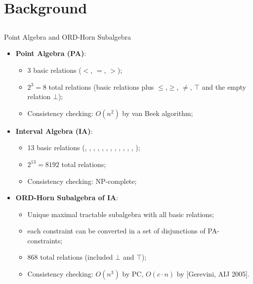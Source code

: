 \section{Background}

\subsection{}
\begin{frame}{Point Algebra and ORD-Horn Subalgebra}

	\begin{itemize}
		\item \textbf{Point Algebra (PA)}:
			\begin{itemize}
				\item 3 basic relations ($<$, $=$, $>$);
				\item $2^3 = 8$ total relations (basic relations plus $\leq$,$\geq$, $\not =$, $\top$ and the empty relation $\bot$);
				\item Consistency checking: $O(n^2)$ by van Beek algorithm;
			\end{itemize}
			
		\item \textbf{Interval Algebra (IA)}: 
			\begin{itemize}
				\item 13 basic relations ({\footnotesize \iab{}, \iabi{}, \iam{}, \iami{}, \iao{}, \iaoi{}, \iad{}, \iadi{}, \ias{}, \iasi{}, \iaf{}, \iafi{}, \iaeq{}});
				\item $2^{13}=8192$ total relations;
				\item Consistency checking: NP-complete;
			\end{itemize}
		
		\item \textbf{ORD-Horn Subalgebra of IA}: 
			\begin{itemize}
				\item Unique maximal tractable subalgebra with all basic relations;
				\item each constraint can be converted in a set of disjunctions of PA-constraints;
				\item 868 total relations (included $\bot$ and $\top$);
				\item Consistency checking: $O(n^3)$ by PC, $O(c \cdot n)$ by \OHSAT{} [Gerevini, AIJ 2005].
			\end{itemize}
	\end{itemize}
		
\end{frame}

